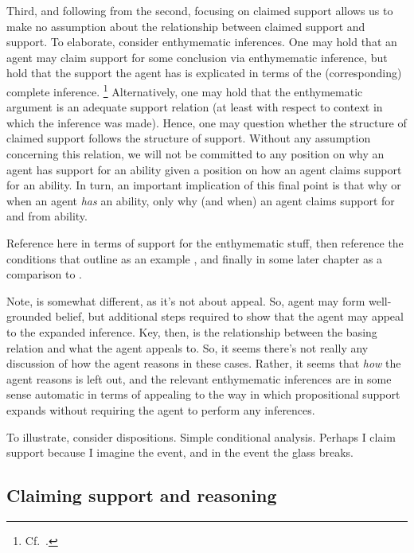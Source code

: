 \begin{note}
  Third, and following from the second, focusing on claimed support allows us to make no assumption about the relationship between claimed support and support.
  To elaborate, consider enthymematic inferences.
  One may hold that an agent may claim support for some conclusion via enthymematic inference, but hold that the support the agent has is explicated in terms of the (corresponding) complete inference.\nolinebreak
  \footnote{
    Cf.\ \textcite{Moretti:2019wx}.
  }
  Alternatively, one may hold that the enthymematic argument is an adequate support relation (at least with respect to context in which the inference was made).
  Hence, one may question whether the structure of claimed support follows the structure of support.
  Without any assumption concerning this relation, we will not be committed to any position on why an agent has support for an ability given a position on how an agent claims support for an ability.
  In turn, an important implication of this final point is that why or when an agent \emph{has} an ability, only why (and when) an agent claims support for and from ability.

  {
    \color{red}
    Reference \citeauthor{Moretti:2019wx} here in terms of support for the enthymematic stuff, then reference the conditions that \citeauthor{Moretti:2019wx} outline as an example \ESU{}, and finally in some later chapter as a comparison to \EAS{}.
    \citeauthor{Moretti:2019wx}

    Note, \citeauthor{Moretti:2019wx} is somewhat different, as it's not about appeal.
    So, agent may form well-grounded belief, but additional steps required to show that the agent may appeal to the expanded inference.
    Key, then, is the relationship between the basing relation and what the agent appeals to.
    So, it seems there's not really any discussion of how the agent reasons in these cases.
    Rather, it seems that \emph{how} the agent reasons is left out, and the relevant enthymematic inferences are in some sense automatic in terms of appealing to the way in which propositional support expands without requiring the agent to perform any inferences.
  }


  To illustrate, consider dispositions.
  Simple conditional analysis.
  Perhaps I claim support because I imagine the event, and in the event the glass breaks.
\end{note}

\subsection{Claiming support and reasoning}
\label{sec:claimed-support}

